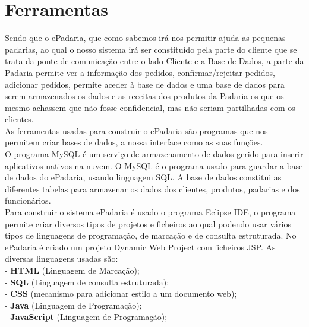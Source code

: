 \section{Ferramentas}
Sendo que o ePadaria, que como sabemos irá nos permitir ajuda as pequenas padarias, ao qual o nosso sistema irá ser constituído pela parte do cliente que se trata da ponte de comunicação entre o lado Cliente e a Base de Dados, a parte da Padaria permite ver a informação dos pedidos, confirmar/rejeitar pedidos, adicionar pedidos, permite aceder à base de dados e uma base de dados para serem armazenados os dados e as receitas dos produtos da Padaria os que os mesmo achassem que não fosse confidencial, mas não seriam partilhadas com os clientes.\\
As ferramentas usadas para construir o ePadaria são programas que nos permitem criar bases de dados, a nossa interface como as suas funções. \\
O programa MySQL é um serviço de armazenamento de dados gerido para inserir aplicativos nativos na nuvem. O MySQL é o programa usado para guardar a base de dados do ePadaria, usando linguagem SQL. A base de dados constitui as diferentes tabelas para armazenar os dados dos clientes, produtos, padarias e dos funcionários.\\
Para construir o sistema ePadaria é usado o programa Eclipse IDE, o programa permite criar diversos tipos de projetos e ficheiros ao qual podendo usar vários tipos de linguagens de programação, de marcação e de consulta estruturada. No ePadaria é criado um projeto Dynamic Web Project com ficheiros JSP. As diversas linguagens usadas são:\\
- \textbf{HTML}  (Linguagem de Marcação);\\
- \textbf{SQL}  (Linguagem de consulta estruturada);\\
- \textbf{CSS}  (mecanismo para adicionar estilo a um documento web);\\
- \textbf{Java}  (Linguagem de Programação);\\
- \textbf{JavaScript} (Linguagem de Programação);\\
